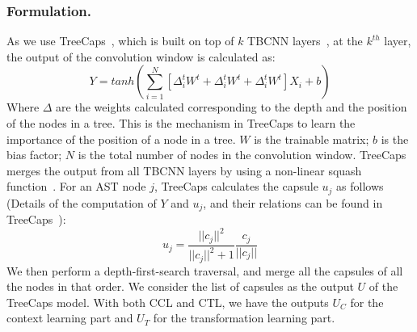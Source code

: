 \subsubsection*{\bf Formulation.}
As we use TreeCaps~\cite{bui2021treecaps}, which is built on top of
$k$ TBCNN layers~\cite{mou2014tbcnn}, at the $k^{th}$ layer, the
output of the convolution window is calculated as:
\begin{equation}\label{eq:treecaps}
	Y = tanh(\sum_{i=1}^{N}[\Delta^t_iW^t + \Delta^t_iW^t + \Delta^t_iW^t]X_i + b)
\end{equation}
Where $\Delta$ are the weights calculated corresponding to the depth
and the position of the nodes in a tree. This is the mechanism in
TreeCaps to learn the importance of the position of a node in a
tree. $W$ is the trainable matrix; $b$ is the bias factor; $N$ is the
total number of nodes in the convolution window. TreeCaps merges the
output from all TBCNN layers by using a non-linear squash
function~\cite{sabour2017dynamic}. For an AST node $j$, TreeCaps
calculates the capsule $u_j$ as follows (Details of the computation of
$Y$ and $u_j$, and their relations can be found in
TreeCaps~\cite{bui2021treecaps}):
\begin{equation}\label{eq:2}
	u_j = \frac{||c_j||^2}{||c_j||^2+1}\frac{c_j}{||c_j||}
\end{equation}
We then perform a depth-first-search traversal, and merge all the
capsules of all the nodes in that order. We consider the list of
capsules as the output $U$ of the TreeCaps model. With both
CCL and CTL, we have the outputs $U_C$ for the context
learning part and $U_T$ for the transformation learning part.

